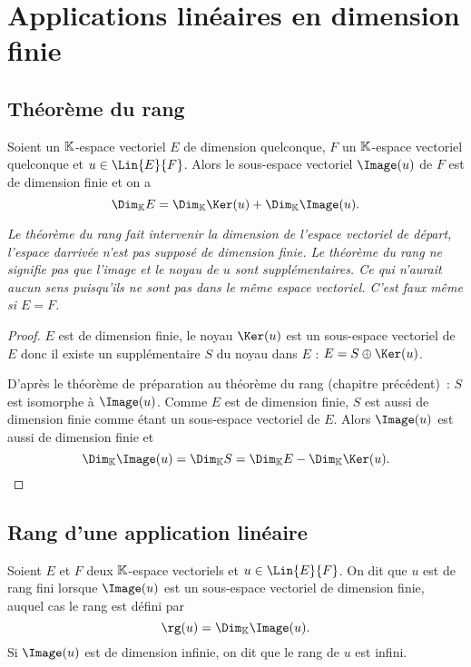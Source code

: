 \section{Applications linéaires en dimension finie}

\subsection{Théorème du rang}

\begin{theo}
  Soient un $\mathbb{K}$-espace vectoriel $E$ de dimension quelconque, $F$ un $\mathbb{K}$-espace vectoriel quelconque et $u \in \Lin{E}{F}$. Alors le sous-espace vectoriel $\Image(u)$ de $F$ est de dimension finie et on a
  \begin{equation}
    \Dim_\K E = \Dim_\K \Ker(u) + \Dim_\K \Image(u).
  \end{equation}
\end{theo}

\emph{Le théorème du rang fait intervenir la dimension de l'espace vectoriel de départ, l'espace darrivée n'est pas supposé de dimension finie. Le théorème du rang ne signifie pas que l'image et le noyau de $u$ sont supplémentaires. Ce qui n'aurait aucun sens puisqu'ils ne sont pas dans le même espace vectoriel. C'est faux même si $E=F$.}
\begin{proof}
  $E$ est de dimension finie, le noyau $\Ker(u)$ est un sous-espace vectoriel de $E$ donc il existe un supplémentaire $S$ du noyau dans $E$ : $E= S \oplus \Ker(u)$.
  
  D'après le théorème de préparation au théorème du rang (chapitre précédent)~: $S$ est isomorphe à $\Image(u)$. Comme $E$ est de dimension finie, $S$ est aussi de dimension finie comme étant un sous-espace vectoriel de $E$. Alors $\Image(u)$ est aussi de dimension finie et 
  \begin{equation}
    \Dim_\K \Image(u) = \Dim_\K S = \Dim_\K E - \Dim_\K \Ker(u).
  \end{equation}
\end{proof}

\subsection{Rang d'une application linéaire}

\begin{defdef}
  Soient $E$ et $F$ deux $\mathbb{K}$-espace vectoriels et $u \in \Lin{E}{F}$. On dit que $u$ est de rang fini lorsque $\Image(u)$ est un sous-espace vectoriel de dimension finie, auquel cas le rang est défini par
  \begin{equation}
    \rg(u) = \Dim_\K \Image(u).
  \end{equation}
  Si $\Image(u)$ est de dimension infinie, on dit que le rang de $u$ est infini.
\end{defdef}

